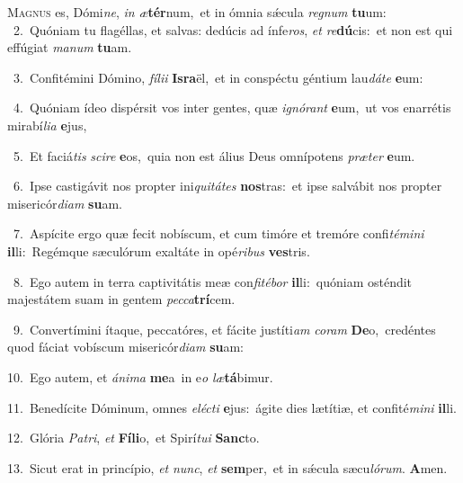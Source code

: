 \lettrine{\initial\textcolor{\initialcolor}{M}}{agnus} es, Dómi\-\textit{ne}\-, \textit{in} \textit{æ}\-\textbf{tér}num,~\star et in ómnia sǽcula \textit{re}\-\textit{gnum} \textbf{tu}\-um:\\
{\numbfont\textcolor{\numbcolor}{~2.}}~Quóniam tu flagéllas, et salvas: dedúcis ad ínfe\-\textit{ros}\-, \textit{et} \textit{re}\-\textbf{dú}cis:~\star et non est qui effúgiat \textit{ma}\-\textit{num} \textbf{tu}\-am.\par
{\numbfont\textcolor{\numbcolor}{~3.}}~Confitémini Dómino, \textit{fí}\-\textit{li}\textit{i} \textbf{Is}\-\textbf{ra}ël,~\star et in conspéctu géntium lau\-\textit{dá}\-\textit{te} \textbf{e}\-um:\par
{\numbfont\textcolor{\numbcolor}{~4.}}~Quóniam ídeo dispérsit vos inter gentes, quæ \textit{i}\-\textit{gnó}\textit{rant} \textbf{e}\-um,~\star ut vos enarrétis mirabí\-\textit{li}\-\textit{a} \textbf{e}\-jus,\par
{\numbfont\textcolor{\numbcolor}{~5.}}~Et faciá\textit{tis} \textit{sci}\-\textit{re} \textbf{e}\-os,~\star quia non est álius Deus omnípotens \textit{præ}\-\textit{ter} \textbf{e}\-um.\par
{\numbfont\textcolor{\numbcolor}{~6.}}~Ipse castigávit nos propter ini\-\textit{qui}\-\textit{tá}\textit{tes} \textbf{nos}\-tras:~\star et ipse salvábit nos propter misericór\-\textit{di}\-\textit{am} \textbf{su}\-am.\par
{\numbfont\textcolor{\numbcolor}{~7.}}~Aspícite ergo quæ fecit nobíscum, et cum timóre et tremóre confi\-\textit{té}\-\textit{mi}\textit{ni} \textbf{il}\-li:~\star Regémque sæculórum exaltáte in opé\-\textit{ri}\-\textit{bus} \textbf{ves}\-tris.\par
{\numbfont\textcolor{\numbcolor}{~8.}}~Ego autem in terra captivitátis meæ con\-\textit{fi}\-\textit{té}\textit{bor} \textbf{il}\-li:~\star quóniam osténdit majestátem suam in gentem \textit{pec}\-\textit{ca}\textbf{trí}cem.\par
{\numbfont\textcolor{\numbcolor}{~9.}}~Convertímini ítaque, peccatóres, et fácite justíti\textit{am} \textit{co}\-\textit{ram} \textbf{De}\-o,~\star credéntes quod fáciat vobíscum misericór\-\textit{di}\-\textit{am} \textbf{su}\-am:\par
{\numbfont\textcolor{\numbcolor}{10.}}~Ego autem, et \textit{á}\-\textit{ni}\textit{ma} \textbf{me}\-a~\star in e\textit{o} \textit{læ}\-\textbf{tá}bimur.\par
{\numbfont\textcolor{\numbcolor}{11.}}~Benedícite Dóminum, omnes \textit{e}\-\textit{léc}\textit{ti} \textbf{e}\-jus:~\star ágite dies lætítiæ, et confité\-\textit{mi}\-\textit{ni} \textbf{il}\-li.\par
{\numbfont\textcolor{\numbcolor}{12.}}~Glória \textit{Pa}\-\textit{tri}, \textit{et} \textbf{Fí}\-\textbf{li}o,~\star et Spirí\-\textit{tu}\-\textit{i} \textbf{Sanc}\-to.\par
{\numbfont\textcolor{\numbcolor}{13.}}~Sicut erat in princípio, \textit{et} \textit{nunc}\-, \textit{et} \textbf{sem}\-per,~\star et in sǽcula sæcu\-\textit{ló}\-\textit{rum}. \textbf{A}\-men.\par
